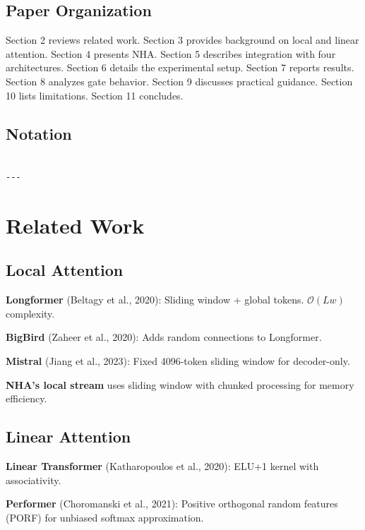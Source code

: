 \subsection{Paper Organization}

Section 2 reviews related work. Section 3 provides background on local and 
linear attention. Section 4 presents NHA. Section 5 describes integration 
with four architectures. Section 6 details the experimental setup. Section 
7 reports results. Section 8 analyzes gate behavior. Section 9 discusses 
practical guidance. Section 10 lists limitations. Section 11 concludes.



\subsection{Notation}

\begin{lstlisting}

---
\end{lstlisting}


\section{Related Work}

\subsection{Local Attention}

\textbf{Longformer} (Beltagy et al., 2020): Sliding window + global tokens. 
$\mathcal{O}(L w)$ complexity.

\textbf{BigBird} (Zaheer et al., 2020): Adds random connections to Longformer.

\textbf{Mistral} (Jiang et al., 2023): Fixed 4096-token sliding window for 
decoder-only.

\textbf{NHA's local stream} uses sliding window with chunked processing for 
memory efficiency.

\subsection{Linear Attention}

\textbf{Linear Transformer} (Katharopoulos et al., 2020): ELU+1 kernel with 
associativity.

\textbf{Performer} (Choromanski et al., 2021): Positive orthogonal random features 
(PORF) for unbiased softmax approximation.

